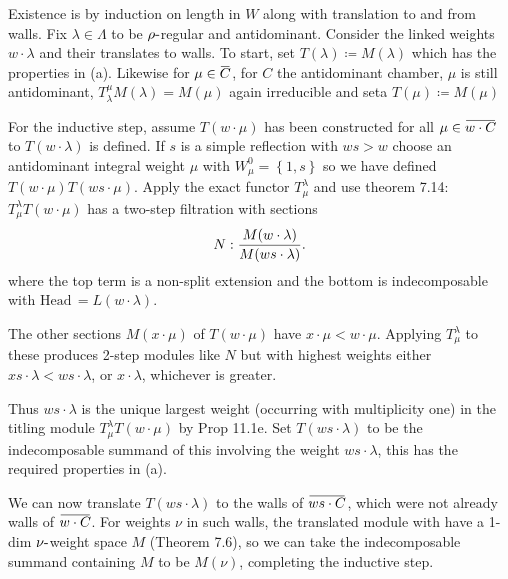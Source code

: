 \documentclass[11pt]{scrartcl}
\theoremstyle{definition}
\theoremstyle{theorem}
\theoremstyle{proof}
\newenvironment{proof}
{\pushQED{$\qed$}\pf}
{\par\popQED\endpf}
\theoremstyle{definition}
\theoremstyle{break}
\theoremstyle{problem}
\newcommand{\dash}[0]{{\hbox{-}}}
\newcommand{\definedas}[0]{\coloneqq}
\newcommand{\hd}[0]{\mathrm{Head}\,}
\newcommand{\theset}[1]{\left\{{#1}\right\}}
\renewcommand{\bar}[1]{\mkern 1.5mu\overline{\mkern-1.5mu#1\mkern-1.5mu}\mkern 1.5mu}
\renewcommand{\qed}[0]{\hfill\blacksquare}
\begin{document}
\begin{proof}[of (a)]

Existence is by induction on length in \(W\) along with translation to
and from walls. Fix \(\lambda \in \Lambda\) to be \(\rho\dash\)regular
and antidominant. Consider the linked weights \(w\cdot \lambda\) and
their translates to walls. To start, set
\(T(\lambda) \definedas M(\lambda)\) which has the properties in (a).
Likewise for \(\mu \in \bar C\), for \(C\) the antidominant chamber,
\(\mu\) is still antidominant, \(T_\lambda^\mu M(\lambda) = M(\mu)\)
again irreducible and seta \(T(\mu) \definedas M(\mu)\)

For the inductive step, assume \(T(w\cdot \mu)\) has been constructed
for all \(\mu \in \bar{w\cdot C}\) to \(T(w\cdot \lambda)\) is defined.
If \(s\) is a simple reflection with \(ws > w\) choose an antidominant
integral weight \(\mu\) with \(W_{\mu}^0 = \theset{1, s}\) so we have
defined \(T(w\cdot \mu) T(ws \cdot \mu)\). Apply the exact functor
\(T_\mu^\lambda\) and use theorem 7.14: \(T_\mu^\lambda T(w\cdot \mu)\)
has a two-step filtration with sections \begin{align*}
N: {M(w\cdot \lambda) \over M(ws\cdot \lambda)  }
.\end{align*} where the top term is a non-split extension and the bottom
is indecomposable with \(\hd = L(w\cdot \lambda)\).

The other sections \(M(x\cdot \mu)\) of \(T(w\cdot \mu)\) have
\(x\cdot \mu < w\cdot \mu\). Applying \(T_\mu^\lambda\) to these
produces 2-step modules like \(N\) but with highest weights either
\(xs \cdot \lambda < ws\cdot \lambda\), or \(x\cdot \lambda\), whichever
is greater.

\hfill\break

Thus \(ws \cdot \lambda\) is the unique largest weight (occurring with
multiplicity one) in the titling module \(T_\mu^\lambda T(w\cdot \mu)\)
by Prop 11.1e. Set \(T(ws\cdot \lambda)\) to be the indecomposable
summand of this involving the weight \(ws\cdot \lambda\), this has the
required properties in (a).

\hfill\break

We can now translate \(T(ws\cdot \lambda)\) to the walls of
\(\bar{ws\cdot C}\), which were not already walls of \(\bar{w\cdot C}\).
For weights \(\nu\) in such walls, the translated module with have a
1-dim \(\nu\dash\)weight space \(M\) (Theorem 7.6), so we can take the
indecomposable summand containing \(M\) to be \(M(\nu)\), completing the
inductive step.\end{proof}
\end{document}
